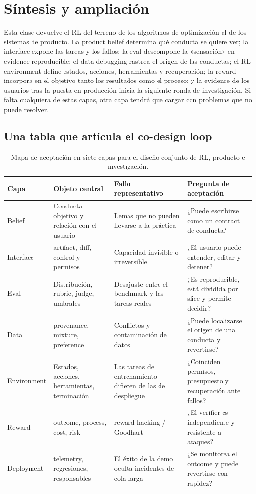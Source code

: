 \section{Síntesis y ampliación}

Esta clase devuelve el RL del terreno de los algoritmos de optimización al de los sistemas de producto. La product belief determina qué conducta se quiere ver; la interface expone las tareas y los fallos; la eval descompone la «sensación» en evidence reproducible; el data debugging rastrea el origen de las conductas; el RL environment define estados, acciones, herramientas y recuperación; la reward incorpora en el objetivo tanto los resultados como el proceso; y la evidence de los usuarios tras la puesta en producción inicia la siguiente ronda de investigación. Si falta cualquiera de estas capas, otra capa tendrá que cargar con problemas que no puede resolver.

\subsection{Una tabla que articula el co-design loop}

\begin{table}[H]
\centering
\small
\begin{tabular}{@{}L{0.16\textwidth}L{0.24\textwidth}L{0.27\textwidth}L{0.23\textwidth}@{}}
\toprule
Capa & Objeto central & Fallo representativo & Pregunta de aceptación \\
\midrule
Belief & Conducta objetivo y relación con el usuario & Lemas que no pueden llevarse a la práctica & ¿Puede escribirse como un contract de conducta? \\
Interface & artifact, diff, control y permisos & Capacidad invisible o irreversible & ¿El usuario puede entender, editar y detener? \\
Eval & Distribución, rubric, judge, umbrales & Desajuste entre el benchmark y las tareas reales & ¿Es reproducible, está dividida por slice y permite decidir? \\
Data & provenance, mixture, preference & Conflictos y contaminación de datos & ¿Puede localizarse el origen de una conducta y revertirse? \\
Environment & Estados, acciones, herramientas, terminación & Las tareas de entrenamiento difieren de las de despliegue & ¿Coinciden permisos, presupuesto y recuperación ante fallos? \\
Reward & outcome, process, cost, risk & reward hacking / Goodhart & ¿El verifier es independiente y resistente a ataques? \\
Deployment & telemetry, regresiones, responsables & El éxito de la demo oculta incidentes de cola larga & ¿Se monitorea el outcome y puede revertirse con rapidez? \\
\bottomrule
\end{tabular}
\caption{Mapa de aceptación en siete capas para el diseño conjunto de RL, producto e investigación.}
\end{table}

